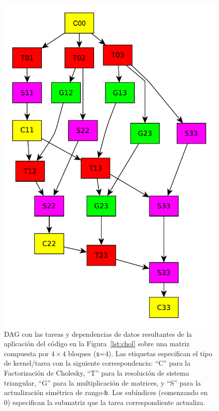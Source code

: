 \begin{figure}%
\begin{center}
\includegraphics[scale=0.35]{Figures/4x4_TaskExample}
\end{center}
	\caption[DAG con las tareas y dependencias de datos resultantes de la aplicación del código en la Figura~\ref{lst:chol}
         sobre una matriz compuesta por $4 \times 4$ bloques ({\tt s}=4).]
	 {DAG con las tareas y dependencias de datos resultantes de la aplicación del código en la Figura~\ref{lst:chol}
         sobre una matriz compuesta por $4 \times 4$ bloques ({\tt s}=4). Las etiquetas especifican el tipo de kernel/tarea
         con la siguiente correspondencia: 
         ``{\sf C}'' para la Factorización de Cholesky,
         ``{\sf T}'' para la resolución de sistema triangular,
         ``{\sf G}'' para la multiplicación de matrices, y
         ``{\sf S}'' para la actualización simétrica de rango-{\tt b}. 
	 Los subíndices (comenzando en 0) especifican la submatriz que la tarea correspondiente actualiza.}
\label{fig:dag}
\end{figure}

